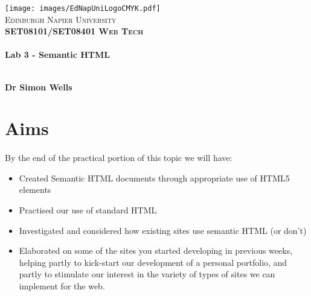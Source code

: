 \documentclass[10pt, a4paper]{article}
\begin{document}

\begin{titlepage}
\vspace*{5cm}
\begin{center}
\texttt{[image: images/EdNapUniLogoCMYK.pdf]}~\\[1cm]

\textsc{\Large Edinburgh Napier University}\\[1.5cm]

\textsc{\LARGE \bfseries SET08101/SET08401 Web Tech}\\[0.5cm]

\hrulefill \\[0.4cm]
{\huge \bfseries Lab 3 - Semantic HTML \\[0.4cm] }
\hrulefill \\[1.5cm]

\begin{minipage}{0.4\textwidth}
\begin{flushleft} \large
\textbf{Dr Simon Wells} \\
\end{flushleft}
\end{minipage}

\vfill

\end{center}
\end{titlepage}




%

\section{Aims}
\paragraph{} By the end of the practical portion of this topic we will have:

\begin{itemize}
\item Created Semantic HTML documents through appropriate use of HTML5 elements
\item Practised our use of standard HTML
\item Investigated and considered how existing sites use semantic HTML (or don't)
\item Elaborated on some of the sites you started developing in previous weeks, helping partly to kick-start our development of a personal portfolio, and partly to stimulate our interest in the variety of types of sites we can implement for the web.
\end{itemize}
\end{document}
